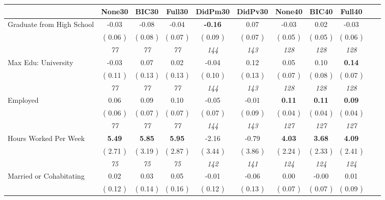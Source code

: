 \begin{tabular}{l c c c c c c c c c c}
\toprule
 & None30 & BIC30 & Full30 & DidPm30 & DidPv30 & None40 & BIC40 & Full40 \\
\midrule
Graduate from High School &     -0.03 &     -0.08 &     -0.04 & \textbf{     -0.16 } &      0.07 &     -0.03 &      0.02 &     -0.03 \\
& (     0.06 ) & (     0.08 ) & (     0.07 ) & (     0.09 ) & (     0.07 ) & (     0.05 ) & (     0.05 ) & (     0.06 ) \\
& \textit{ 77 } & \textit{ 77 } & \textit{ 77 } & \textit{ 144 } & \textit{ 143 } & \textit{ 128 } & \textit{ 128 } & \textit{ 128 } \\
Max Edu: University &     -0.03 &      0.07 &      0.02 &     -0.04 &      0.12 &      0.05 &      0.10 & \textbf{      0.14 } \\
& (     0.11 ) & (     0.13 ) & (     0.13 ) & (     0.10 ) & (     0.13 ) & (     0.07 ) & (     0.08 ) & (     0.07 ) \\
& \textit{ 77 } & \textit{ 77 } & \textit{ 77 } & \textit{ 144 } & \textit{ 143 } & \textit{ 128 } & \textit{ 128 } & \textit{ 128 } \\
Employed &      0.06 &      0.09 &      0.10 &     -0.05 &     -0.01 & \textbf{      0.11 } & \textbf{      0.11 } & \textbf{      0.09 } \\
& (     0.06 ) & (     0.07 ) & (     0.07 ) & (     0.07 ) & (     0.09 ) & (     0.04 ) & (     0.04 ) & (     0.04 ) \\
& \textit{ 77 } & \textit{ 77 } & \textit{ 77 } & \textit{ 144 } & \textit{ 143 } & \textit{ 127 } & \textit{ 127 } & \textit{ 127 } \\
Hours Worked Per Week & \textbf{      5.49 } & \textbf{      5.85 } & \textbf{      5.95 } &     -2.16 &     -0.79 & \textbf{      4.03 } & \textbf{      3.68 } & \textbf{      4.09 } \\
& (     2.71 ) & (     3.19 ) & (     2.87 ) & (     3.44 ) & (     3.86 ) & (     2.24 ) & (     2.33 ) & (     2.41 ) \\
& \textit{ 75 } & \textit{ 75 } & \textit{ 75 } & \textit{ 142 } & \textit{ 141 } & \textit{ 124 } & \textit{ 124 } & \textit{ 124 } \\
Married or Cohabitating &      0.02 &      0.03 &      0.05 &     -0.01 &     -0.06 &      0.00 &     -0.00 &      0.01 \\
& (     0.12 ) & (     0.14 ) & (     0.16 ) & (     0.12 ) & (     0.13 ) & (     0.07 ) & (     0.07 ) & (     0.09 ) \\

\end{tabular}
